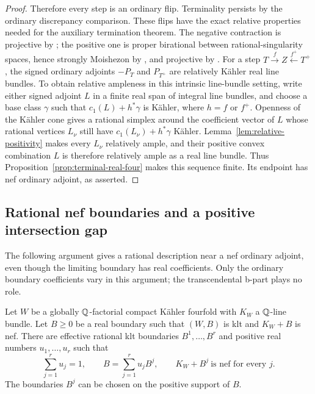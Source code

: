 \begin{proof}
Therefore every step is an ordinary flip.  Terminality persists by the
ordinary discrepancy comparison.  These flips have the exact relative
properties needed for the auxiliary termination theorem.  The negative
contraction is projective by \cite[Proposition~4.2]{HX2026}; the positive
one is proper birational between rational-singularity spaces, hence
strongly Moishezon by \cite[Lemma~2.39]{HX2026}, and projective by
\cite[Lemma~2.40]{HX2026}.  For a step
$T\xrightarrow{f}Z\xleftarrow{f^+}T^+$, the signed ordinary adjoints
$-P_T$ and $P_{T^+}$ are relatively Kähler real line bundles.
To obtain relative ampleness in this intrinsic line-bundle setting,
write either signed adjoint $L$ in a finite real span of integral line
bundles, and choose a base class $\gamma$ such that
$c_1(L)+h^*\gamma$ is Kähler, where $h=f$ or $f^+$.
Openness of the Kähler cone gives a rational simplex around the
coefficient vector of $L$ whose rational vertices $L_\nu$ still have
$c_1(L_\nu)+h^*\gamma$ Kähler.  Lemma~\ref{lem:relative-positivity}
makes every $L_\nu$ relatively ample, and their positive convex
combination $L$ is therefore relatively ample as a real line bundle.  Thus
Proposition~\ref{prop:terminal-real-four} makes this sequence finite.
Its endpoint has nef ordinary adjoint, as asserted.
\end{proof}

\subsection{Rational nef boundaries and a positive intersection gap}

The following argument gives a rational description near a nef ordinary
adjoint, even though the limiting boundary has real coefficients.
Only the ordinary boundary coefficients vary in this argument; the
transcendental b-part plays no role.

\begin{lemma}
\label{lem:rational-nef-polytope}
Let $W$ be a globally $\mathbb Q$-factorial compact Kähler fourfold with $K_W$
a $\mathbb Q$-line bundle.  Let $B\ge0$ be a real boundary such that $(W,B)$ is
klt and $K_W+B$ is nef.  There are effective rational klt boundaries
$B^1,\ldots,B^r$ and positive real numbers $u_1,\ldots,u_r$ such that
\[
 \sum_{j=1}^r u_j=1,\qquad
 B=\sum_{j=1}^r u_jB^j,\qquad
 K_W+B^j\ \text{is nef for every }j.
\]
The boundaries $B^j$ can be chosen on the positive support of $B$.
\end{lemma}

